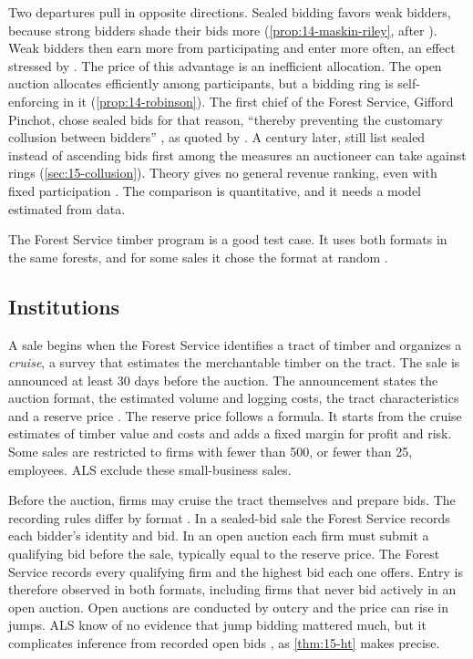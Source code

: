 Two departures pull in opposite directions. Sealed bidding favors weak bidders, because strong bidders
shade their bids more (\cref{prop:14-maskin-riley}, after \citealp{MaskinRiley2000}). Weak bidders then earn more from participating
and enter more often, an effect stressed by \citet{Klemperer2004}. The price of this advantage is an
inefficient allocation. The open auction allocates efficiently among participants, but a bidding ring
is self-enforcing in it (\cref{prop:14-robinson}). The first chief of the Forest Service, Gifford
Pinchot, chose sealed bids for that reason, ``thereby preventing the customary collusion between
bidders'' \citep[p.~209]{Pinchot1998}, as quoted by \citet[footnote 2]{AtheyLevinSeira2011}. A century
later, \citet[ch.~10, p.~207]{MarshallMarx2012} still list sealed instead of ascending bids first among
the measures an auctioneer can take against rings (\cref{sec:15-collusion}). Theory
gives no general revenue ranking, even with fixed participation \citep[p.~215]{AtheyLevinSeira2011}.
The comparison is quantitative, and it needs a model estimated from data.

The Forest Service timber program is a good test case. It uses both formats in the same forests, and
for some sales it chose the format at random \citep[p.~207]{AtheyLevinSeira2011}.

\subsection{Institutions}\label{sec:15-als-institutions}

A sale begins when the Forest Service identifies a tract of timber and organizes a \emph{cruise}, a
survey that estimates the merchantable timber on the tract. The sale is announced at least 30 days
before the auction. The announcement states the auction format, the estimated volume and logging
costs, the tract characteristics and a reserve price \citep[p.~218]{AtheyLevinSeira2011}. The reserve
price follows a formula. It starts from the cruise estimates of timber value and costs and adds a fixed
margin for profit and risk. Some sales are restricted to firms with fewer than 500, or fewer than 25,
employees. ALS exclude these small-business sales.

Before the auction, firms may cruise the tract themselves and prepare bids. The recording rules differ
by format \citep[p.~219]{AtheyLevinSeira2011}. In a sealed-bid sale the Forest Service records each
bidder's identity and bid. In an open auction each firm must submit a qualifying bid before the sale,
typically equal to the reserve price. The Forest Service records every qualifying firm and the highest
bid each one offers. Entry is therefore observed in both formats, including firms that never bid
actively in an open auction. Open auctions are conducted by outcry and the price can rise in jumps. ALS
know of no evidence that jump bidding mattered much, but it complicates inference from recorded open
bids \citep[footnote 3]{AtheyLevinSeira2011}, as \cref{thm:15-ht} makes precise.

